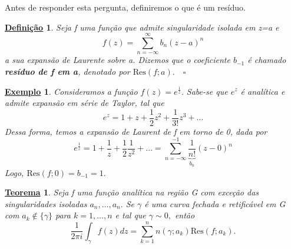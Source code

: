 \documentclass{article}
\newtheorem*{def*}{\underline{Defini\c c\~ao}}
\newtheorem*{theorem*}{\underline{Teorema}}
\newtheorem{example}{\underline{Exemplo}}[section]
\begin{document}
  Antes de responder esta pergunta, definiremos o que é um resíduo.
  \begin{def*}
    Seja f uma função que admite singularidade isolada em z=a e 
    \[
      f(z) = \sum\limits_{n=-\infty}^{\infty}b_{n}(z-a)^{n}
    \]
  a sua expansão de Laurente sobre a. Dizemos que o coeficiente \(b_{-1}\) é chamado \textbf{resíduo de f em a},
  denotado por \(\mathrm{Res}(f; a).\quad \square\)
  \end{def*}
  \begin{example}
    Consideramos a função \(f(z) = e^{\frac{1}{z}}.\) Sabe-se que \(e^{z}\) é analítica e admite expansão em série 
de Taylor, tal que 
  \[
    e^{z} = 1 + z + \frac{1}{2}z^{2} + \frac{1}{3!}z^{3} + \dotsc
  \]
  Dessa forma, temos a expansão de Laurent de f em torno de 0, dada por 
  \[
    e^{\frac{1}{z}} = 1 + \frac{1}{z} + \frac{1}{2}\frac{1}{z^{2}}+\dotsc  = \sum\limits_{n=-\infty}^{-1}\underbrace{\frac{1}{n!}}_{b_{n}}(z-0)^{n}
  \]
  Logo, \(\mathrm{Res}(f; 0) = b_{-1} = 1.\)
  \end{example}
\hypertarget{residue}{ \begin{theorem*}
   Seja f uma função analítica na região G com exceção das singularidades isoladas \(a_{n},\dotsc ,a_{n}.\) Se \(\gamma \) é uma curva fechada e retificável
em G com \(a_{k}\not\in\{\gamma \}\) para \(k=1, \dotsc , n\) e tal que \(\gamma \sim 0,\) então 
  \[
    \frac{1}{2\pi i}\int_{\gamma }^{}f(z)dz = \sum\limits_{k=1}^{n}n(\gamma; a_{k})\mathrm{Res}(f; a_{k}).
  \]
 \end{theorem*}}
\end{document}
